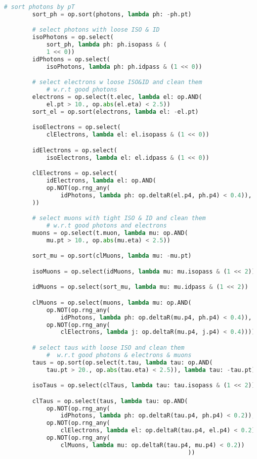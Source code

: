 \begin{lstlisting}[language=Python, caption=Python module of the analysis used in Bamboo framework, label={bamboocode}]
        # sort photons by pT
        sort_ph = op.sort(photons, lambda ph: -ph.pt)

        # select photons with loose ISO & ID
        isoPhotons = op.select(
            sort_ph, lambda ph: ph.isopass & (
            1 << 0))
        idPhotons = op.select(
            isoPhotons, lambda ph: ph.idpass & (1 << 0))

        # select electrons w loose ISO&ID and clean them
            # w.r.t good photons
        electrons = op.select(t.elec, lambda el: op.AND(
            el.pt > 10., op.abs(el.eta) < 2.5))
        sort_el = op.sort(electrons, lambda el: -el.pt)

        isoElectrons = op.select(
            clElectrons, lambda el: el.isopass & (1 << 0))

        idElectrons = op.select(
            isoElectrons, lambda el: el.idpass & (1 << 0))

        clElectrons = op.select(
            idElectrons, lambda el: op.AND(
            op.NOT(op.rng_any(
                idPhotons, lambda ph: op.deltaR(el.p4, ph.p4) < 0.4)),
        ))

        # select muons with tight ISO & ID and clean them
            # w.r.t good photons and electrons
        muons = op.select(t.muon, lambda mu: op.AND(
            mu.pt > 10., op.abs(mu.eta) < 2.5))

        sort_mu = op.sort(clMuons, lambda mu: -mu.pt)

        isoMuons = op.select(idMuons, lambda mu: mu.isopass & (1 << 2))

        idMuons = op.select(sort_mu, lambda mu: mu.idpass & (1 << 2))

        clMuons = op.select(muons, lambda mu: op.AND(
            op.NOT(op.rng_any(
                idPhotons, lambda ph: op.deltaR(mu.p4, ph.p4) < 0.4)),
            op.NOT(op.rng_any(
                clElectrons, lambda j: op.deltaR(mu.p4, j.p4) < 0.4))))

        # select taus with loose ISO and clean them
            #  w.r.t good photons & electrons & muons
        taus = op.sort(op.select(t.tau, lambda tau: op.AND(
            tau.pt > 20., op.abs(tau.eta) < 2.5)), lambda tau: -tau.pt)

        isoTaus = op.select(clTaus, lambda tau: tau.isopass & (1 << 2))

        clTaus = op.select(taus, lambda tau: op.AND(
            op.NOT(op.rng_any(
                idPhotons, lambda ph: op.deltaR(tau.p4, ph.p4) < 0.2)),
            op.NOT(op.rng_any(
                clElectrons, lambda el: op.deltaR(tau.p4, el.p4) < 0.2)),
            op.NOT(op.rng_any(
                clMuons, lambda mu: op.deltaR(tau.p4, mu.p4) < 0.2))
                                                    ))


\end{lstlisting}
